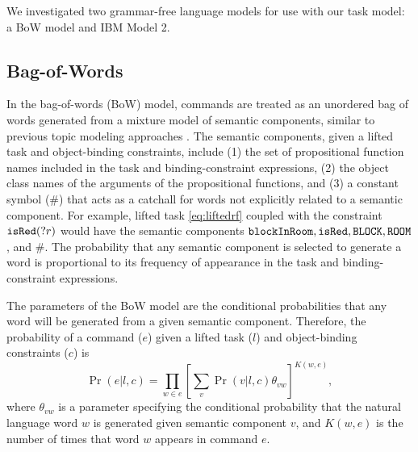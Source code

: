 \documentclass[conference]{IEEEtran}
\begin{document}
We investigated two grammar-free language models for use with our task model: a BoW model and IBM Model 2.

\subsection{Bag-of-Words}
In the bag-of-words (BoW) model, commands are treated as an unordered bag of words generated from a mixture model of semantic components, similar to previous topic modeling approaches \cite{McCallum:1999vn}. The semantic components, given a lifted task and object-binding constraints, include (1) the set of propositional function names included in the task and binding-constraint expressions, (2) the object class names of the arguments of the propositional functions, and (3) a constant symbol ($\#$) that acts as a catchall for words not explicitly related to a semantic component. For example, lifted task \ref{eq:liftedrf} coupled with the constraint ${\tt isRed}(?r)$ would have the semantic components ${\tt blockInRoom}, {\tt isRed}, {\tt BLOCK}, {\tt ROOM}$, and $\#$. The probability that any semantic component is selected to generate a word is proportional to its frequency of appearance in the task and binding-constraint expressions.

The parameters of the BoW model are the conditional probabilities that any word will be generated from a given semantic component. Therefore, the probability of a command ($e$) given a lifted task ($l$) and object-binding constraints ($c$) is
\begin{equation}
\Pr(e | l, c)  = \prod_{w \in e} \left[ \sum_v \Pr(v | l, c) \theta_{vw} \right]^{K(w, e)},
\end{equation}
where $\theta_{vw}$ is a parameter specifying the conditional probability that the natural language word $w$ is generated given semantic component $v$, and $K(w, e)$ is the number of times that word $w$ appears in command $e$.


\end{document}
